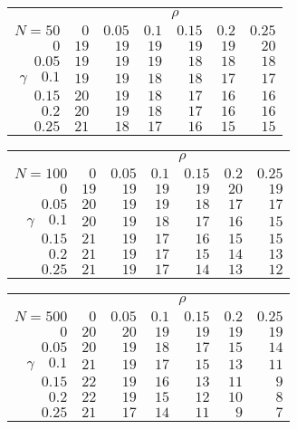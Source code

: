 \begin{tabular}{r|rrrrrr}
\hline\hline
 &\multicolumn{6}{c}{$\rho$} \\ 
 $N = 50$ & $0$ & $0.05$ & $0.1$ & $0.15$ & $0.2$ & $0.25$ \\ 
 \hline$0$ & $19$ & $19$ & $19$ & $19$ & $19$ & $20$\\ 
$0.05$ & $19$ & $19$ & $19$ & $18$ & $18$ & $18$\\ 
$\gamma\quad$$0.1$ & $19$ & $19$ & $18$ & $18$ & $17$ & $17$\\ 
$0.15$ & $20$ & $19$ & $18$ & $17$ & $16$ & $16$\\ 
$0.2$ & $20$ & $19$ & $18$ & $17$ & $16$ & $16$\\ 
$0.25$ & $21$ & $18$ & $17$ & $16$ & $15$ & $15$\\ 
 \hline 
 \end{tabular}
 
 \vspace{2em} 
 
\begin{tabular}{r|rrrrrr}
\hline\hline
 &\multicolumn{6}{c}{$\rho$} \\ 
 $N = 100$ & $0$ & $0.05$ & $0.1$ & $0.15$ & $0.2$ & $0.25$ \\ 
 \hline$0$ & $19$ & $19$ & $19$ & $19$ & $20$ & $19$\\ 
$0.05$ & $20$ & $19$ & $19$ & $18$ & $17$ & $17$\\ 
$\gamma\quad$$0.1$ & $20$ & $19$ & $18$ & $17$ & $16$ & $15$\\ 
$0.15$ & $21$ & $19$ & $17$ & $16$ & $15$ & $15$\\ 
$0.2$ & $21$ & $19$ & $17$ & $15$ & $14$ & $13$\\ 
$0.25$ & $21$ & $19$ & $17$ & $14$ & $13$ & $12$\\ 
 \hline 
 \end{tabular}
 
 \vspace{2em} 
 
\begin{tabular}{r|rrrrrr}
\hline\hline
 &\multicolumn{6}{c}{$\rho$} \\ 
 $N = 500$ & $0$ & $0.05$ & $0.1$ & $0.15$ & $0.2$ & $0.25$ \\ 
 \hline$0$ & $20$ & $20$ & $19$ & $19$ & $19$ & $19$\\ 
$0.05$ & $20$ & $19$ & $18$ & $17$ & $15$ & $14$\\ 
$\gamma\quad$$0.1$ & $21$ & $19$ & $17$ & $15$ & $13$ & $11$\\ 
$0.15$ & $22$ & $19$ & $16$ & $13$ & $11$ & $9$\\ 
$0.2$ & $22$ & $19$ & $15$ & $12$ & $10$ & $8$\\ 
$0.25$ & $21$ & $17$ & $14$ & $11$ & $9$ & $7$\\ 
 \hline 
 \end{tabular}